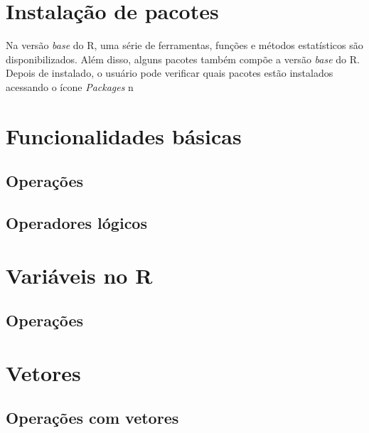 \documentclass[
]{book}
\theoremstyle{definition}
\theoremstyle{definition}
\theoremstyle{definition}
\theoremstyle{remark}
\begin{document}
\hypertarget{instalauxe7uxe3o-de-pacotes}{%
\section{Instalação de pacotes}\label{instalauxe7uxe3o-de-pacotes}}

Na versão \emph{base} do R, uma série de ferramentas, funções e métodos estatísticos são disponibilizados. Além disso, alguns pacotes também compõe a versão \emph{base} do R. Depois de instalado, o usuário pode verificar quais pacotes estão instalados acessando o ícone \emph{Packages} n

\hypertarget{funcionalidades-buxe1sicas}{%
\section{Funcionalidades básicas}\label{funcionalidades-buxe1sicas}}

\hypertarget{operauxe7uxf5es}{%
\subsection{Operações}\label{operauxe7uxf5es}}

\hypertarget{operadores-luxf3gicos}{%
\subsection{Operadores lógicos}\label{operadores-luxf3gicos}}

\hypertarget{variuxe1veis-no-r}{%
\section{Variáveis no R}\label{variuxe1veis-no-r}}

\hypertarget{operauxe7uxf5es-1}{%
\subsection{Operações}\label{operauxe7uxf5es-1}}

\hypertarget{vetores}{%
\section{Vetores}\label{vetores}}

\hypertarget{operauxe7uxf5es-com-vetores}{%
\subsection{Operações com vetores}\label{operauxe7uxf5es-com-vetores}}
\end{document}
